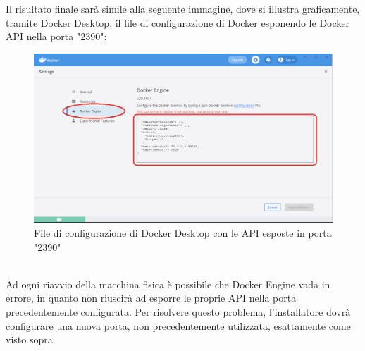 Il risultato finale sarà simile alla seguente immagine, dove si illustra graficamente, tramite Docker Desktop, il file di configurazione di Docker esponendo le Docker API nella porta "2390":
\begin{figure}[!h]     
\centering 
    \includegraphics[width=0.7 \columnwidth]{immagini/img/docker_desktop_conf} 
    \caption{File di configurazione di Docker Desktop con le API esposte in porta "2390"}
\end{figure}\\
Ad ogni riavvio della macchina fisica è possibile che Docker Engine vada in errore, in quanto non riuscirà ad esporre le proprie API nella porta precedentemente configurata. Per risolvere questo problema, l'installatore dovrà configurare una nuova porta, non precedentemente utilizzata, esattamente come visto sopra.\\










